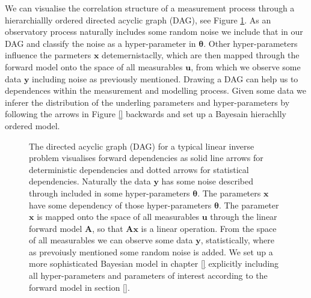We can visualise the correlation structure of a measurement process through a hierarchiallly ordered directed acyclic graph (DAG), see Figure \ref{fig:FirstDAG}.
As an observatory process naturally includes some random noise we include that in our DAG and classify the noise as a hyper-parameter in $\bm{\theta}$.
Other hyper-parameters influence the parmeters $\bm{x}$ detemernistaclly, which are then mapped through the forward model onto the space of all measurables $\bm{u}$, from which we observe some data $\bm{y}$ including noise as previously mentioned.
Drawing a DAG can help us to dependences within the measurement and modelling process.
Given some data we inferer the distribution of the underling parameters and hyper-parameters by following the arrows in Figure \ref{} backwards and set up a Bayesain hierachlly ordered model.


\begin{figure}[ht!]
	\centering
	\caption[Bayesian Inference DAG]{The directed acyclic graph (DAG) for a typical linear inverse problem visualises forward dependencies as solid line arrows for deterministic dependencies and dotted arrows for statistical dependencies.
	Naturally the data $\bm{y}$ has some noise described through included in some hyper-parameters $\bm{\theta}$.
	The parameters $\bm{x}$ have some dependency of those hyper-parameters $\bm{\theta}$. The parameter $\bm{x}$ is mapped onto the space of all measurables $\bm{u}$ through the linear forward model $\bm{A}$, so that $\bm{Ax}$ is a linear operation.
	From the space of all measurables we can observe some data $\bm{y}$, statistically, where as prevoiusly mentioned some random noise is added.
	We set up a more sophisticated Bayesian model in chapter \ref{} explicitly including all hyper-parameters and parameters of interest according to the forward model in section \ref{}.}
	\label{fig:FirstDAG}
\end{figure}

